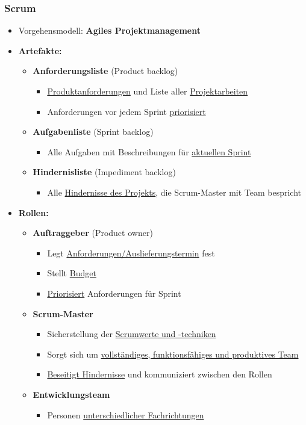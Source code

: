 \newpage
\subsubsection{Scrum}
			
\begin{itemize}
\item Vorgehensmodell: \textbf{Agiles Projektmanagement}
\item \textbf{Artefakte:}
\begin{itemize}
\item \textbf{Anforderungsliste} (Product backlog)
\begin{itemize}
\item \underline{Produktanforderungen} und Liste aller \underline{Projektarbeiten}
\item Anforderungen vor jedem Sprint \underline{priorisiert}
\end{itemize}
\item \textbf{Aufgabenliste} (Sprint backlog)
\begin{itemize}
\item Alle Aufgaben mit Beschreibungen für \underline{aktuellen Sprint}
\end{itemize}
\item \textbf{Hindernisliste} (Impediment backlog)
\begin{itemize}
\item Alle \underline{Hindernisse des Projekts}, die Scrum-Master mit Team bespricht
\end{itemize}
\end{itemize}
\item \textbf{Rollen:}
\begin{itemize}
\item \textbf{Auftraggeber} (Product owner)
\begin{itemize}
\item Legt \underline{Anforderungen/Auslieferungstermin} fest
\item Stellt \underline{Budget}
\item \underline{Priorisiert} Anforderungen für Sprint
\end{itemize}
\item \textbf{Scrum-Master}
\begin{itemize}
\item Sicherstellung der \underline{Scrumwerte und -techniken}
\item Sorgt sich um \underline{vollständiges, funktionsfähiges und produktives Team}
\item \underline{Beseitigt Hindernisse} und kommuniziert zwischen den Rollen
\end{itemize}
\item \textbf{Entwicklungsteam}
\begin{itemize}
\item Personen \underline{unterschiedlicher Fachrichtungen}
\end{itemize}
\end{itemize}


\end{itemize}
